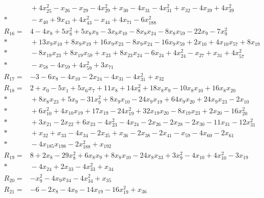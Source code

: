 \begin{align*}
&{} + 4x_{25}^{2} - x_{26} - x_{29} - 4x_{29}^{2} + x_{30} - 4x_{31} - 4x_{31}^{2} + x_{32} - 4x_{39} + 4x_{39}^{2} \\*
&{} - x_{40} + 9x_{43} + 4x_{43}^{2} - x_{44} + 4x_{71} - 6x_{188}^{2} \\[4pt]
R_{16} ={}& 4 - 4x_{8} + 5x_{8}^{2} + 5x_{8}x_{9} - 3x_{8}x_{10} - 8x_{8}x_{24} - 8x_{8}x_{59} - 22x_{9} - 7x_{9}^{2} \\*
&{} + 13x_{9}x_{10} + 8x_{9}x_{19} + 16x_{9}x_{23} - 8x_{9}x_{24} - 16x_{9}x_{59} + 2x_{10} + 4x_{10}x_{57} + 8x_{19} \\*
&{} - 8x_{19}x_{23} + 8x_{19}x_{59} + x_{23} + 8x_{23}x_{24} - 6x_{24} + 4x_{24}^{2} - x_{27} + x_{31} + 4x_{57}^{2} \\*
&{} - x_{58} - 4x_{59} + 4x_{59}^{2} + 3x_{71} \\[4pt]
R_{17} ={}& -3 - 6x_{8} - 4x_{10} - 2x_{24} - 4x_{31} - 4x_{31}^{2} + x_{32} \\[4pt]
R_{18} ={}& 2 + x_{0} - 5x_{1} + 5x_{6}x_{7} + 11x_{8} + 14x_{8}^{2} + 18x_{8}x_{9} - 10x_{8}x_{10} + 16x_{8}x_{20} \\*
&{} + 8x_{8}x_{23} + 5x_{9} - 31x_{9}^{2} + 8x_{9}x_{10} - 24x_{9}x_{19} + 64x_{9}x_{20} + 24x_{9}x_{23} - 2x_{10} \\*
&{} + 6x_{10}^{2} + 4x_{10}x_{19} + 17x_{19} - 24x_{19}^{2} + 32x_{19}x_{20} - 8x_{19}x_{23} + 2x_{20} - 16x_{20}^{2} \\*
&{} + 3x_{21} - 2x_{22} + 6x_{23} - 4x_{23}^{2} - 4x_{24} - 2x_{26} - 2x_{28} - 2x_{30} - 11x_{31} - 12x_{31}^{2} \\*
&{} + x_{32} + x_{33} - 4x_{34} - 2x_{35} + x_{36} - 2x_{38} - 2x_{41} - x_{59} - 4x_{60} - 2x_{61} \\*
&{} - 4x_{185}x_{198} - 2x_{188}^{2} + x_{192} \\[4pt]
R_{19} ={}& 8 + 2x_{8} - 29x_{8}^{2} + 6x_{8}x_{9} + 8x_{8}x_{10} - 24x_{8}x_{33} + 3x_{9}^{2} - 4x_{10} + 4x_{10}^{2} - 3x_{19} \\*
&{} - 4x_{24} + 2x_{33} - 4x_{33}^{2} + x_{34} \\[4pt]
R_{20} ={}& -x_{9}^{2} - 4x_{9}x_{34} - 4x_{34}^{2} + x_{35} \\[4pt]
R_{21} ={}& -6 - 2x_{8} - 4x_{9} - 14x_{19} - 16x_{19}^{2} + x_{36} \\[4pt]

\end{align*}
